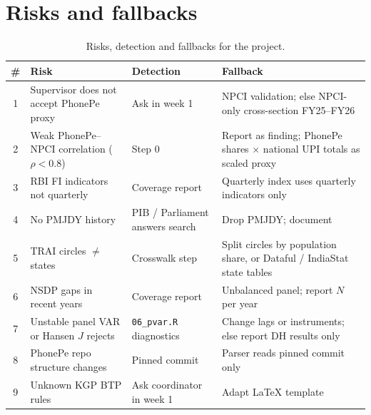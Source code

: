 \section{Risks and fallbacks}
\begin{table}[tbp]
\centering\small
\begin{tabularx}{\textwidth}{@{}c >{\raggedright\arraybackslash}X >{\raggedright\arraybackslash}X >{\raggedright\arraybackslash}X@{}}
\toprule
\# & Risk & Detection & Fallback \\
\midrule
1 & Supervisor does not accept PhonePe proxy & Ask in week 1 & NPCI validation; else NPCI-only cross-section FY25--FY26 \\
2 & Weak PhonePe--NPCI correlation ($\rho < 0.8$) & Step 0 & Report as finding; PhonePe shares $\times$ national UPI totals as scaled proxy \\
3 & RBI FI indicators not quarterly & Coverage report & Quarterly index uses quarterly indicators only \\
4 & No PMJDY history & PIB / Parliament answers search & Drop PMJDY; document \\
5 & TRAI circles $\neq$ states & Crosswalk step & Split circles by population share, or Dataful / IndiaStat state tables \\
6 & NSDP gaps in recent years & Coverage report & Unbalanced panel; report $N$ per year \\
7 & Unstable panel VAR or Hansen $J$ rejects & \texttt{06\_pvar.R} diagnostics & Change lags or instruments; else report DH results only \\
8 & PhonePe repo structure changes & Pinned commit & Parser reads pinned commit only \\
9 & Unknown KGP BTP rules & Ask coordinator in week 1 & Adapt \LaTeX{} template \\
\bottomrule
\end{tabularx}
\caption{Risks, detection and fallbacks for the project.}
\label{tab:risks}
\end{table}
